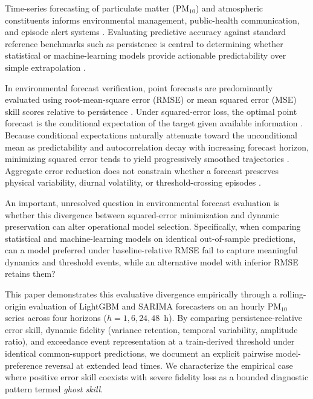 \documentclass[12pt]{article}
\begin{document}
Time-series forecasting of particulate matter ($\mathrm{PM}_{10}$) and atmospheric constituents informs environmental management, public-health communication, and episode alert systems \citep{who2021,wilks2011,bonas2025}. Evaluating predictive accuracy against standard reference benchmarks such as persistence is central to determining whether statistical or machine-learning models provide actionable predictability over simple extrapolation \citep{hyndman2006,bonas2025}.

In environmental forecast verification, point forecasts are predominantly evaluated using root-mean-square error (RMSE) or mean squared error (MSE) skill scores relative to persistence \citep{hyndman2006,makridakis2018,cerqueira2020}. Under squared-error loss, the optimal point forecast is the conditional expectation of the target given available information \citep{gneiting2011}. Because conditional expectations naturally attenuate toward the unconditional mean as predictability and autocorrelation decay with increasing forecast horizon, minimizing squared error tends to yield progressively smoothed trajectories \citep{murphy1988,taylor2001}. Aggregate error reduction does not constrain whether a forecast preserves physical variability, diurnal volatility, or threshold-crossing episodes \citep{jolliffe2012}.

An important, unresolved question in environmental forecast evaluation is whether this divergence between squared-error minimization and dynamic preservation can alter operational model selection. Specifically, when comparing statistical and machine-learning models on identical out-of-sample predictions, can a model preferred under baseline-relative RMSE fail to capture meaningful dynamics and threshold events, while an alternative model with inferior RMSE retains them?

This paper demonstrates this evaluative divergence empirically through a rolling-origin evaluation of LightGBM and SARIMA forecasters on an hourly $\mathrm{PM}_{10}$ series across four horizons ($h = 1, 6, 24, 48$~h). By comparing persistence-relative error skill, dynamic fidelity (variance retention, temporal variability, amplitude ratio), and exceedance event representation at a train-derived threshold under identical common-support predictions, we document an explicit pairwise model-preference reversal at extended lead times. We characterize the empirical case where positive error skill coexists with severe fidelity loss as a bounded diagnostic pattern termed \emph{ghost skill}.
\end{document}
